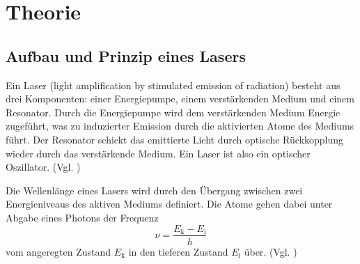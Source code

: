 
\section{Theorie}
\label{sec:Theorie}

\subsection{Aufbau und Prinzip eines Lasers}
Ein Laser (light amplification by stimulated emission of radiation) besteht aus drei Komponenten: einer Energiepumpe, einem verstärkenden Medium und einem Resonator.
Durch die Energiepumpe wird dem verstärkenden Medium Energie zugeführt, was zu induzierter Emission durch die aktivierten Atome des Mediums führt. Der Resonator schickt das emittierte Licht durch optische Rückkopplung wieder durch das verstärkende Medium. Ein Laser ist also ein optischer Oszillator. (Vgl. \cite{Laserspektroskopie})

Die Wellenlänge eines Lasers wird durch den Übergang zwischen zwei Energieniveaus des aktiven Mediums definiert. Die Atome gehen dabei unter Abgabe eines Photons
der Frequenz
\begin{equation*}
    \nu = \frac{E_\text{k} - E_\text{i}}{h}
\end{equation*}
vom angeregten Zustand $E_\text{k}$ in den tieferen Zustand $E_\text{i}$ über. (Vgl. \cite{Laserspektroskopie})



